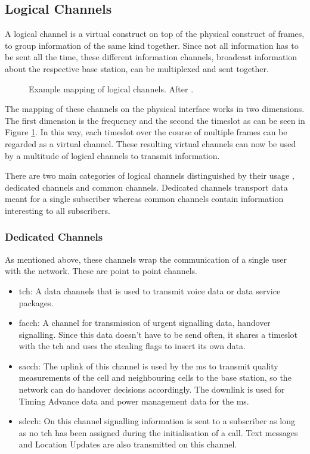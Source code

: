\subsection{Logical Channels}
\label{sec:channels}
A logical channel is a virtual construct on top of the physical construct of frames, to group information of the same kind together.
Since not all information has to be sent all the time, these different information channels, \eg broadcast information about the respective base station, can be multiplexed and sent together.
\begin{figure}
	\centering
	\caption{Example mapping of logical channels. After \cite{protocols1999}.}
	\label{fig:channels}
\end{figure}
The mapping of these channels on the physical interface works in two dimensions.
The first dimension is the frequency and the second the timeslot as can be seen in Figure \ref{fig:channels}.
In this way, each timeslot over the course of multiple frames can be regarded as a virtual channel.
These resulting virtual channels can now be used by a multitude of logical channels to transmit information.

There are two main categories of logical channels distinguished by their usage \cite{kommsys2006}, dedicated channels and common channels.
Dedicated channels transport data meant for a single subscriber whereas common channels contain information interesting to all subscribers.

\subsubsection{Dedicated Channels}
As mentioned above, these channels wrap the communication of a single user with the network.
These are point to point channels.
\begin{itemize}
	\item \gls{tch}: A data channels that is used to transmit voice data or data service packages.
	\item \gls{facch}: A channel for transmission of urgent signalling data, \eg handover signalling.
	Since this data doesn't have to be send often, it shares a timeslot with the \gls{tch} and uses the stealing flags to insert its own data.
	\item \gls{sacch}: The uplink of this channel is used by the \gls{ms} to transmit quality measurements of the cell and neighbouring cells to the base station, so the network can do handover decisions accordingly.
	The downlink is used for Timing Advance data and power management data for the \gls{ms}.
	\item \gls{sdcch}: On this channel signalling information is sent to a subscriber as long as no \gls{tch} has been assigned during the initialisation of a call.
	Text messages and Location Updates are also transmitted on this channel.
\end{itemize}

